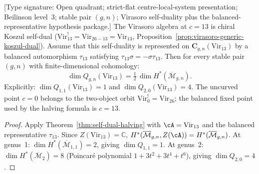 \begin{corollary}
\label{cor:virasoro-quantum-dim}
\textup{[Type signature: Open quadrant; strict-flat
centre-local-system presentation; Beilinson level~3; stable pair
\((g,n)\); Virasoro self-duality plus the balanced-representative
hypothesis package.]}
The Virasoro algebra at $c = 13$ is chiral Koszul self-dual
($\mathrm{Vir}_{13}^! = \mathrm{Vir}_{26-13} = \mathrm{Vir}_{13}$,
Proposition~\ref{prop:virasoro-generic-koszul-dual}).
Assume that this self-duality is represented on
$\mathbf C_{g,n}(\mathrm{Vir}_{13})$ by a balanced automorphism
$\tau_{13}$ satisfying
$\tau_{13}\sigma=-\sigma\tau_{13}$. Then for every stable pair
\((g,n)\) with finite-dimensional cohomology:
\begin{equation}\label{eq:virasoro-quantum-dim}
\dim Q_{g,n}(\mathrm{Vir}_{13})
= \tfrac{1}{2}\,\dim H^*(\overline{\mathcal{M}}_{g,n}).
\end{equation}
Explicitly: $\dim Q_{1,1}(\mathrm{Vir}_{13}) = 1$ and
$\dim Q_{2,0}(\mathrm{Vir}_{13}) = 4$.
The uncurved point $c=0$ belongs to the two-object orbit
$\mathrm{Vir}_0^!=\mathrm{Vir}_{26}$; the balanced fixed point used
by the halving formula is $c=13$.
\end{corollary}

\begin{proof}
Apply Theorem~\ref{thm:self-dual-halving} with
$\cA = \mathrm{Vir}_{13}$ and the balanced representative
$\tau_{13}$. Since $Z(\mathrm{Vir}_{13}) = \mathbb{C}$,
$H^*(\overline{\mathcal{M}}_{g,n}, Z(\cA))
= H^*(\overline{\mathcal{M}}_{g,n})$.
At genus~1: $\dim H^*(\overline{\mathcal{M}}_{1,1}) = 2$,
giving $\dim Q_{1,1}=1$. At genus~2:
$\dim H^*(\overline{\mathcal{M}}_2) = 8$
(Poincar\'e polynomial $1 + 3t^2 + 3t^4 + t^6$),
giving $\dim Q_{2,0}=4$.
\end{proof}

